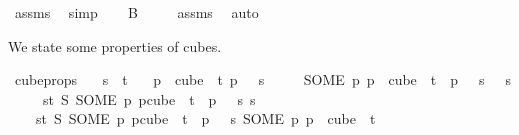 \begin{isabellebody}
\ assms{\isacharparenleft}{\kern0pt}{}{\isacharparenright}{\kern0pt}\ \isamarkupfalse%
\ simp\isanewline
{}\isamarkupfalse%
\isanewline
\ \ \isamarkupfalse%
\ {\isachardoublequoteopen}B\ {}\ {\isasymnoteq}\ {\isacharbraceleft}{\kern0pt}{\isacharbraceright}{\kern0pt}{\isachardoublequoteclose}\ \isamarkupfalse%
\ assms{\isacharparenleft}{\kern0pt}{}{\isacharparenright}{\kern0pt}\ \isamarkupfalse%
\ auto\isanewline
{}\isamarkupfalse%
%
\endisatagproof
{\isafoldproof}%
%
\isadelimproof
%
\endisadelimproof
%
\begin{isamarkuptext}%
We state some properties of cubes.%
\end{isamarkuptext}\isamarkuptrue%
\isamarkupfalse%
\ cube{\isacharunderscore}{\kern0pt}props{\isacharcolon}{\kern0pt}\isanewline
\ \ \ {\isachardoublequoteopen}s\ {\isacharless}{\kern0pt}\ t{\isachardoublequoteclose}\isanewline
\ \ \ {\isachardoublequoteopen}{\isasymexists}p\ {\isasymin}\ cube\ {}\ t{\isachardot}{\kern0pt}\ p\ {}\ {\isacharequal}{\kern0pt}\ s{\isachardoublequoteclose}\isanewline
\ \ \ \ \ {\isachardoublequoteopen}{\isacharparenleft}{\kern0pt}SOME\ p{\isachardot}{\kern0pt}\ p\ {\isasymin}\ cube\ {}\ t\ {\isasymand}\ p\ {}\ {\isacharequal}{\kern0pt}\ s{\isacharparenright}{\kern0pt}\ {}\ {\isacharequal}{\kern0pt}\ s{\isachardoublequoteclose}\isanewline
\ \ \ \ \ {\isachardoublequoteopen}{\isacharparenleft}{\kern0pt}{\isasymlambda}s{\isasymin}{\isacharbraceleft}{\kern0pt}{\isachardot}{\kern0pt}{\isachardot}{\kern0pt}{\isacharless}{\kern0pt}t{\isacharbraceright}{\kern0pt}{\isachardot}{\kern0pt}\ S\ {\isacharparenleft}{\kern0pt}SOME\ p{\isachardot}{\kern0pt}\ p{\isasymin}cube\ {}\ t\ {\isasymand}\ p\ {}\ {\isacharequal}{\kern0pt}\ s{\isacharparenright}{\kern0pt}{\isacharparenright}{\kern0pt}\ s\ {\isacharequal}{\kern0pt}\isanewline
\ \ \ \ {\isacharparenleft}{\kern0pt}{\isasymlambda}s{\isasymin}{\isacharbraceleft}{\kern0pt}{\isachardot}{\kern0pt}{\isachardot}{\kern0pt}{\isacharless}{\kern0pt}t{\isacharbraceright}{\kern0pt}{\isachardot}{\kern0pt}\ S\ {\isacharparenleft}{\kern0pt}SOME\ p{\isachardot}{\kern0pt}\ p{\isasymin}cube\ {}\ t\ {\isasymand}\ p\ {}\ {\isacharequal}{\kern0pt}\ s{\isacharparenright}{\kern0pt}{\isacharparenright}{\kern0pt}\ {\isacharparenleft}{\kern0pt}{\isacharparenleft}{\kern0pt}SOME\ p{\isachardot}{\kern0pt}\ p\ {\isasymin}\ cube\ {}\ t\isanewline

\end{isabellebody}
